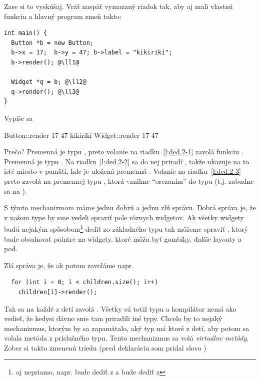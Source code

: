 Zase si to vyskúšaj. Vráť naspäť vymazaný riadok tak, aby  aj 
mali vlastnú funkciu  a hlavný program zmeň takto:

\begin{lstlisting}[label={l:ded.2}]
int main() {
  Button *b = new Button;
  b->x = 17;  b->y = 47; b->label = "kikirikí";
  b->render(); @\ll1@

  Widget *q = b; @\ll2@
  q->render(); @\ll3@
}
\end{lstlisting}

Vypíše sa

\begin{outputBox}
Button::render 17 47 kikirikí
Widget::render 17 47
\end{outputBox}

Prečo? Premenná  je typu , preto volanie  na 
riadku~\ref{l:ded.2-1} zavolá funkciu .
Premenná  je typu . Na riadku~\ref{l:ded.2-2} sa do nej priradí 
, takže  ukazuje na to isté miesto v pamäti, kde je uložená premenná .
Volanie  na riadku~\ref{l:ded.2-3} preto zavolá 
na premennej typu , ktorá vznikne ``orezaním''  do typu 
(t.j. zabudne sa na ).

S týmto mechanizmom máme jednu dobrú a jednu zlú správu. Dobrá správa je, že v našom type
 by sme vedeli spraviť pole rôznych widgetov. Ak všetky widgety budú nejakým 
spôsobom\footnote{aj nepriamo, napr.  bude dediť z  a 
bude dediť z }
dediť zo základného typu  tak môžeme spraviť ,
ktorý bude obsahovať pointre na widgety, ktoré môžu byť gombíky, ďalšie layouty a pod.

Zlá správa je, že ak potom zavoláme napr.

\begin{lstlisting}
  for (int i = 0; i < children.size(); i++) 
    children[i]->render();
\end{lstlisting}

Tak sa na každé z detí zavolá . Všetky sú totiž typu 
a kompilátor nemá ako vedieť, že kedysi dávno sme tam priradili iné typy. 
Chcelo by to nejaký mechanizmus, ktorým by sa zapamätalo, aký typ má ktoré z detí, aby potom
sa volala metóda  z príslušného typu. 
Tento mechanizmus sa volá {\em virtuálne metódy}. 
Zober si takto zmenenú triedu (pred deklaráciu 
som pridal slovo )

